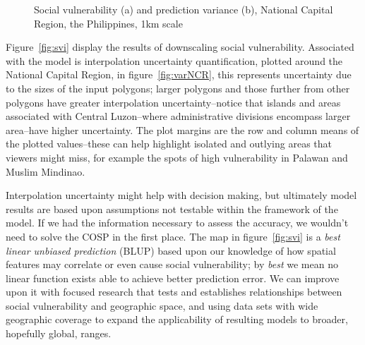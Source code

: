 \documentclass[]{interact}
\theoremstyle{plain}%
\theoremstyle{definition}
\theoremstyle{remark}
\begin{document}
\begin{figure}
  \centering
  \caption{Social vulnerability (a) and prediction variance (b), National Capital Region, the Philippines, 1km scale}
\end{figure}

Figure~\ref{fig:svi} display the results of downscaling social vulnerability.  Associated with the model is interpolation uncertainty quantification, plotted around the National Capital Region, in figure~\ref{fig:varNCR}, this represents uncertainty due to the sizes of the input polygons; larger polygons and those further from other polygons have greater interpolation uncertainty--notice that islands and areas associated with Central Luzon--where administrative divisions encompass larger area--have higher uncertainty.  The plot margins are the row and column means of the plotted values--these can help highlight isolated and outlying areas that viewers might miss, for example the spots of high vulnerability in Palawan and Muslim Mindinao.

Interpolation uncertainty might help with decision making, but ultimately model results are based upon assumptions not testable within the framework of the model.  If we had the information necessary to assess the accuracy, we wouldn't need to solve the COSP in the first place.  The map in figure~\ref{fig:svi} is a {\em best linear unbiased prediction} (BLUP) based upon our knowledge of how spatial features may correlate or even cause social vulnerability; by {\em best} we mean no linear function exists able to achieve better prediction error.  We can improve upon it with focused research that tests and establishes relationships between social vulnerability and geographic space, and using data sets with wide geographic coverage to expand the applicability of resulting models to broader, hopefully global, ranges.
\end{document}
